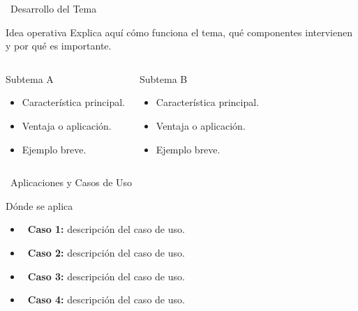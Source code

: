 \documentclass[10pt, aspectratio=169]{beamer}
\begin{document}
\begin{frame}{\faMicrochip \ Desarrollo del Tema}
  \begin{block}{Idea operativa}
    Explica aquí cómo funciona el tema, qué componentes intervienen y por qué es importante.
  \end{block}

  \begin{columns}[T]
    \begin{exampleblock}{Subtema A}
      \begin{itemize}
        \item Característica principal.
        \item Ventaja o aplicación.
        \item Ejemplo breve.
      \end{itemize}
    \end{exampleblock}
    \begin{exampleblock}{Subtema B}
      \begin{itemize}
        \item Característica principal.
        \item Ventaja o aplicación.
        \item Ejemplo breve.
      \end{itemize}
    \end{exampleblock}
  \end{columns}
\end{frame}

\begin{frame}{\faBriefcase \ Aplicaciones y Casos de Uso}
  \begin{block}{Dónde se aplica}
    \begin{itemize}
      \item \textbf{\faBriefcase \ Caso 1:} descripción del caso de uso.
      \item \textbf{\faCogs \ Caso 2:} descripción del caso de uso.
      \item \textbf{\faUsers \ Caso 3:} descripción del caso de uso.
      \item \textbf{\faChartLine \ Caso 4:} descripción del caso de uso.
    \end{itemize}
  \end{block}

  \begin{center}
    \textcolor{unabblue}{\Large \faLightbulb \quad \faProjectDiagram \quad \faClipboardCheck \quad \faChartBar}
  \end{center}
\end{frame}
\end{document}
